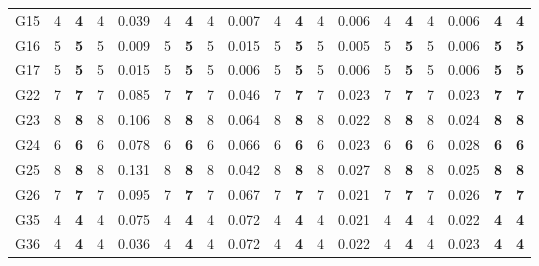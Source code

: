 \documentclass[12pt, a4paper]{article}%
\numberwithin{equation}{section}
\theoremstyle{plain}
\begin{document}
{\begin{landscape}
\begin{longtable}{lllllllllllllllllll}
						G15                       & 4    & \textbf{4}  & 4   & 0.039 & 4    & \textbf{4}  & 4   & 0.007 & 4    & \textbf{4}  & 4   & 0.006 & 4    & \textbf{4}  & 4   & 0.006 & \textbf{4}              & \textbf{4}           \\
						G16                       & 5    & \textbf{5}  & 5   & 0.009 & 5    & \textbf{5}  & 5   & 0.015 & 5    & \textbf{5}  & 5   & 0.005 & 5    & \textbf{5}  & 5   & 0.006 & \textbf{5}              & \textbf{5}           \\
						G17                       & 5    & \textbf{5}  & 5   & 0.015 & 5    & \textbf{5}  & 5   & 0.006 & 5    & \textbf{5}  & 5   & 0.006 & 5    & \textbf{5}  & 5   & 0.006 & \textbf{5}              & \textbf{5}           \\
						G22                       & 7    & \textbf{7}  & 7   & 0.085 & 7    & \textbf{7}  & 7   & 0.046 & 7    & \textbf{7}  & 7   & 0.023 & 7    & \textbf{7}  & 7   & 0.023 & \textbf{7}              & \textbf{7}           \\
						G23                       & 8    & \textbf{8}  & 8   & 0.106 & 8    & \textbf{8}  & 8   & 0.064 & 8    & \textbf{8}  & 8   & 0.022 & 8    & \textbf{8}  & 8   & 0.024 & \textbf{8}              & \textbf{8}           \\
						G24                       & 6    & \textbf{6}  & 6   & 0.078 & 6    & \textbf{6}  & 6   & 0.066 & 6    & \textbf{6}  & 6   & 0.023 & 6    & \textbf{6}  & 6   & 0.028 & \textbf{6}              & \textbf{6}           \\
						G25                       & 8    & \textbf{8}  & 8   & 0.131 & 8    & \textbf{8}  & 8   & 0.042 & 8    & \textbf{8}  & 8   & 0.027 & 8    & \textbf{8}  & 8   & 0.025 & \textbf{8}              & \textbf{8}           \\
						G26                       & 7    & \textbf{7}  & 7   & 0.095 & 7    & \textbf{7}  & 7   & 0.067 & 7    & \textbf{7}  & 7   & 0.021 & 7    & \textbf{7}  & 7   & 0.026 & \textbf{7}              & \textbf{7}           \\
						G35                       & 4    & \textbf{4}  & 4   & 0.075 & 4    & \textbf{4}  & 4   & 0.072 & 4    & \textbf{4}  & 4   & 0.021 & 4    & \textbf{4}  & 4   & 0.022 & \textbf{4}              & \textbf{4}           \\
						G36                       & 4    & \textbf{4}  & 4   & 0.036 & 4    & \textbf{4}  & 4   & 0.072 & 4    & \textbf{4}  & 4   & 0.022 & 4    & \textbf{4}  & 4   & 0.023 & \textbf{4}              & \textbf{4}           \\

\end{longtable}
\end{landscape}}
\end{document}
